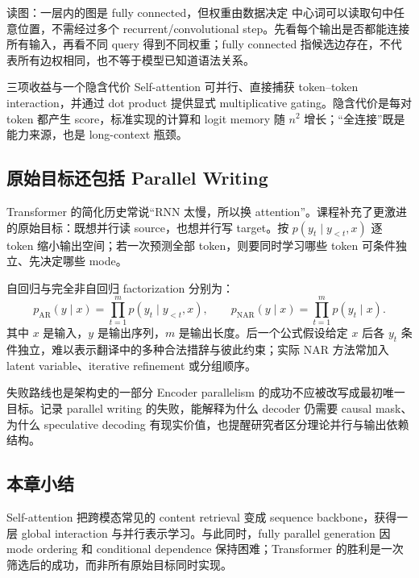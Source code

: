 \begin{knowledgebox}{读图：一层内的图是 fully connected，但权重由数据决定}
中心词可以读取句中任意位置，不需经过多个 recurrent/convolutional step。先看每个输出是否都能连接所有输入，再看不同 query 得到不同权重；fully connected 指候选边存在，不代表所有边权相同，也不等于模型已知道语法关系。
\end{knowledgebox}


\begin{importantbox}{三项收益与一个隐含代价}
Self-attention 可并行、直接捕获 token--token interaction，并通过 dot product 提供显式 multiplicative gating。隐含代价是每对 token 都产生 score，标准实现的计算和 logit memory 随 $n^2$ 增长；“全连接”既是能力来源，也是 long-context 瓶颈。
\end{importantbox}

\subsection{原始目标还包括 Parallel Writing}

Transformer 的简化历史常说“RNN 太慢，所以换 attention”。课程补充了更激进的原始目标：既想并行读 source，也想并行写 target。按 $p(y_t\mid y_{<t},x)$ 逐 token 缩小输出空间；若一次预测全部 token，则要同时学习哪些 token 可条件独立、先决定哪些 mode。


自回归与完全非自回归 factorization 分别为：
\[
p_{\mathrm{AR}}(y\mid x)=\prod_{t=1}^{m}p(y_t\mid y_{<t},x),\qquad
p_{\mathrm{NAR}}(y\mid x)=\prod_{t=1}^{m}p(y_t\mid x).
\]
其中 $x$ 是输入，$y$ 是输出序列，$m$ 是输出长度。后一个公式假设给定 $x$ 后各 $y_t$ 条件独立，难以表示翻译中的多种合法措辞与彼此约束；实际 NAR 方法常加入 latent variable、iterative refinement 或分组顺序。


\begin{warningbox}{失败路线也是架构史的一部分}
Encoder parallelism 的成功不应被改写成最初唯一目标。记录 parallel writing 的失败，能解释为什么 decoder 仍需要 causal mask、为什么 speculative decoding 有现实价值，也提醒研究者区分理论并行与输出依赖结构。
\end{warningbox}

\subsection{本章小结}

Self-attention 把跨模态常见的 content retrieval 变成 sequence backbone，获得一层 global interaction 与并行表示学习。与此同时，fully parallel generation 因 mode ordering 和 conditional dependence 保持困难；Transformer 的胜利是一次筛选后的成功，而非所有原始目标同时实现。

